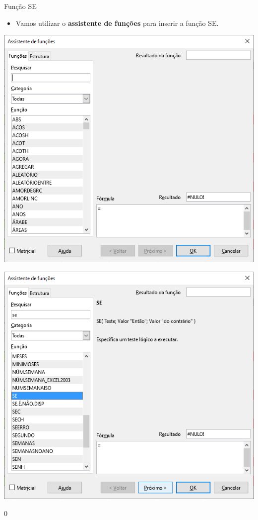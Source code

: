 \begin{frame}{Função SE}
	\begin{block}{}
		\begin{itemize}
			\item Vamos utilizar o \textbf{assistente de funções} para inserir a função SE.
		\end{itemize}
	\end{block}
	
	\bigskip
	
	\begin{minipage}{0.49\linewidth}
		\centering
		\includegraphics[width=1\linewidth]{Figuras/Ch06/fig41}
	\end{minipage}\hfill
	\begin{minipage}{0.49\linewidth}
		\centering
		\includegraphics[width=1\linewidth]{Figuras/Ch06/fig45}
	\end{minipage}
0\end{frame}


